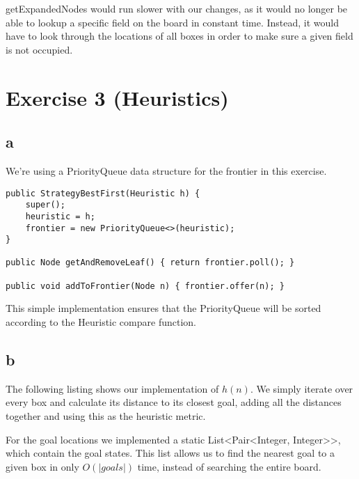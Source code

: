 \documentclass[12pt]{article}
\begin{document}
getExpandedNodes would run slower with our changes, as it would no longer be able to lookup a specific field on the board in constant time. Instead, it would have to look through the locations of all boxes in order to make sure a given field is not occupied.


\section{Exercise 3 (Heuristics)}
\label{sec:Exercise 3 (Heuristics)}

\subsection{a}
\label{sub:a}

We're using a PriorityQueue data structure for the frontier in this exercise.

\begin{lstlisting}
public StrategyBestFirst(Heuristic h) {
    super();
    heuristic = h;
    frontier = new PriorityQueue<>(heuristic);
}

public Node getAndRemoveLeaf() { return frontier.poll(); }

public void addToFrontier(Node n) { frontier.offer(n); }
\end{lstlisting}

This simple implementation ensures that the PriorityQueue will be sorted according to the Heuristic compare function.

\subsection{b}
\label{sub:b}

The following listing shows our implementation of $h(n)$. We simply iterate over every box and calculate its distance to its closest goal, adding all the distances together and using this as the heuristic metric.

For the goal locations we implemented a static List<Pair<Integer, Integer>>, which contain the goal states. This list allows us to find the nearest goal to a given box in only $O(|goals|)$ time, instead of searching the entire board.
\end{document}
